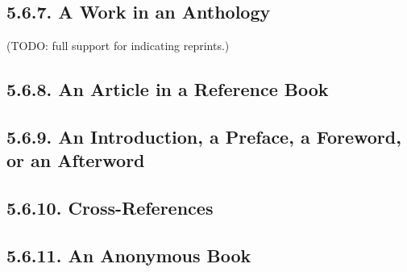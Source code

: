 \documentclass[12pt]{article}
\begin{document}
\printbibliography[heading=blank,segment=6]


\subsection*{5.6.7. A Work in an Anthology}
(TODO: full support for indicating reprints.)
\newrefsegment
\nocite{allende92aa,franco98aa,hansberry71aa,hanzlik92aa,more97aa,witchcraft86aa,douglass00aa,franklin92aa}

\printbibliography[heading=blank,segment=7]


\subsection*{5.6.8. An Article in a Reference Book}
\newrefsegment
\nocite{azimuthal93aa,ginsburg02aa,mandarin94aa,mohanty87aa,noon89aa,allen95aa,le-patourel87aa}

\printbibliography[heading=blank,segment=8]


\subsection*{5.6.9. An Introduction, a Preface, a Foreword, or an Afterword}
\newrefsegment
\nocite{borges73aa,coetzee01aa,drabble85aa,hamill94aa,marsalis93aa,sears01aa,brodsky97aa,doody96aa}

\printbibliography[heading=blank,segment=9]


\subsection*{5.6.10. Cross-References}
\newrefsegment

\nocite{baker86aa}\nocite{baker93aa}\nocite{oates2000aa}\nocite{lennon86aa}\nocite{angelou86aa}\nocite{lebowitz93aa}\nocite{hurston93aa}\nocite{walker00aa}\nocite{rodriguez00aa}\nocite{kingston00aa}\nocite{agee00aa}\nocite{atwan00aa}

\printbibliography[heading=blank,segment=10]


\subsection*{5.6.11. An Anonymous Book}
\newrefsegment

\nocite{bible84aa}\nocite{virginia93aa}\nocite{NewYorkPublicLibrary97aa}
\end{document}

